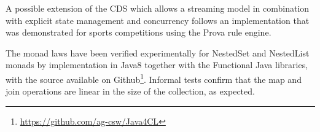 \documentclass[runningheads]{llncs}
\begin{document}
A possible extension of the CDS which allows a streaming model in combination with explicit state management and concurrency follows an implementation\cite{JefferyKP09} that was demonstrated for sports competitions using the Prova rule engine\cite{Prova2012}. 


The monad laws have been verified experimentally for NestedSet and NestedList monads by implementation in Java8 together with the Functional Java\cite{FJ} libraries, with the source available on Github\footnote{\url{https://github.com/ag-csw/Java4CL}}. Informal tests confirm that the map and join operations are linear in the size of the collection, as expected.

\end{document}
